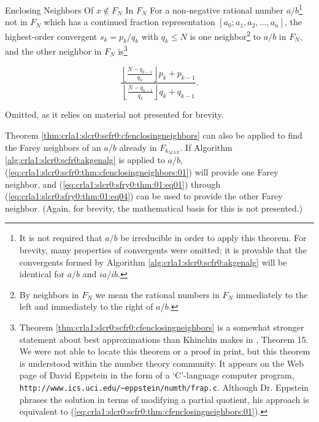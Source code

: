 \begin{vworktheoremstatementpar}{Enclosing Neighbors Of \mbox{\boldmath $x \notin F_N$} 
                                 In \mbox{\boldmath $F_N$}}
\label{thm:crla1:slcr0:scfr0:cfenclosingneighbors}
For a non-negative rational
number $a/b$\footnote{It is not required that $a/b$ be irreducible in
order to apply this theorem.
For brevity, many properties of convergents were omitted; it is provable that 
the convergents formed by Algorithm \ref{alg:crla1:slcr0:scfr0:akgenalg}
will be identical for $a/b$ and $ia/ib$.} not in
$F_N$ which has a
continued fraction representation
$[a_0;a_1,a_2,\ldots{} ,a_n]$, the
highest-order convergent $s_k = p_k/q_k$ with $q_k \leq N$ is one
neighbor\footnote{By neighbors in $F_N$ we mean the rational numbers
in $F_N$ immediately to the left and immediately to the right
of $a/b$.}
to $a/b$ in $F_N$, and the other neighbor in
$F_N$ is\footnote{Theorem \ref{thm:crla1:slcr0:scfr0:cfenclosingneighbors}
is a somewhat stronger statement about best approximations
than Khinchin makes in \cite{bibref:b:KhinchinClassic}, Theorem 15.
We were not able to locate
this theorem or a proof in print,
but this theorem is understood within the number theory community.
It appears on the Web
page of David Eppstein \cite{bibref:i:davideppstein} in the form of a
`C'-language computer program,
\texttt{http://www.ics.uci.edu/\~{}{}eppstein/numth/frap.c}.
Although
Dr. Eppstein phrases the solution in terms of modifying
a partial quotient, his approach is equivalent to
(\ref{eq:crla1:slcr0:scfr0:thm:cfenclosingneighbors:01}).}

\begin{equation}
\label{eq:crla1:slcr0:scfr0:thm:cfenclosingneighbors:01}
\frac{{\displaystyle{\left\lfloor {\frac{{N - q_{k - 1} }}{{q_k }}} \right\rfloor}
 p_k  + p_{k - 1} }}{{\displaystyle{\left\lfloor {\frac{{N - q_{k - 1} }}{{q_k }}}
 \right\rfloor} q_k  + q_{k - 1} }}.
\end{equation}
\end{vworktheoremstatementpar}
\begin{vworktheoremproof}
Omitted, as it relies on material not presented for brevity.
\end{vworktheoremproof}
\vworktheoremfooter{}

Theorem \ref{thm:crla1:slcr0:scfr0:cfenclosingneighbors}
can also be applied to find the Farey neighbors of an $a/b$ already
in $F_{k_{MAX}}$.  If Algorithm \ref{alg:crla1:slcr0:scfr0:akgenalg}
is applied to $a/b$, (\ref{eq:crla1:slcr0:scfr0:thm:cfenclosingneighbors:01})
will provide one Farey neighbor, and 
(\ref{eq:crla1:slcr0:sfry0:thm:01:eq01}) through
(\ref{eq:crla1:slcr0:sfry0:thm:01:eq04}) can be used to provide the other
Farey neighbor.  (Again, for brevity, the mathematical basis for this
is not presented.)

